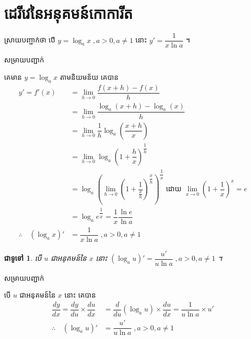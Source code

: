 \documentclass[12pt,fleqn]{book} %
\newtheorem{general}{\kml ជាទូទៅ}
\newcommand{\solution}{{\begin{center}\kml \color{magenta} សម្រាយបញ្ជាក់\end{center} }}
\begin{document}
\section{ដេរីវេនៃអនុគមន៍កោការីត}
ស្រាយបញ្ជាក់ថា បើ $y=\log _a x \;, a>0,a\neq 1$ នោះ $y'=\dfrac{1}{x\ln a}$ ។
\solution 
គេមាន $y=\log_a x$ តាមនិយមន័យ គេបាន
\begin{align*}
y'=f'(x)&=\lim_{h\to 0}\dfrac{f(x+h)-f(x)}{h}\\
&=\lim_{h\to 0}\dfrac{\log_a (x+h)-\log_a (x)}{h}\\
&=\lim_{h\to 0}\dfrac{1}{h}\log_a \left(\dfrac{x+h}{x} \right)\\
&=\lim_{h\to 0}\log_a \left(1+\dfrac{h}{x} \right)^\dfrac{1}{h}\\
&=\log_a \left(\lim_{h\to 0}\left(1+\dfrac{1}{\frac{x}{h}}\right)^{\dfrac{x}{h}}\right)^\dfrac{1}{x}\; \text{ដោយ }\lim_{x\to 0}(1+\dfrac{1}{x})^x=e\\
&=\log_a e^{\dfrac{1}{x}}=\dfrac{1}{x}\dfrac{\ln e}{\ln a}\\
\therefore \quad (\log_a x)'&=\dfrac{1}{x\ln a}\;, a>0,a\neq 1
\end{align*}

\begin{general}
បើ $u$ ជាអនុគមន៍នៃ $x$ នោះ $(\log_a u)'=\dfrac{u'}{u\ln a}\;, a>0,a\neq 1$ ។ 
\end{general}
\solution 
បើ $u$ ជាអនុគមន៍នៃ $x$ នោះ  គេបាន 
\begin{align*}
\dfrac{dy}{dx}=\dfrac{dy}{du}\times \dfrac{du}{dx}&=\dfrac{d}{du}(\log_a u)\times \dfrac{du}{dx}=\dfrac{1}{u\ln a}\times u'\\
\therefore \quad (\log_a u)'&=\dfrac{u'}{u\ln a} \;, a>0,a\neq 1
\end{align*}
\end{document}

